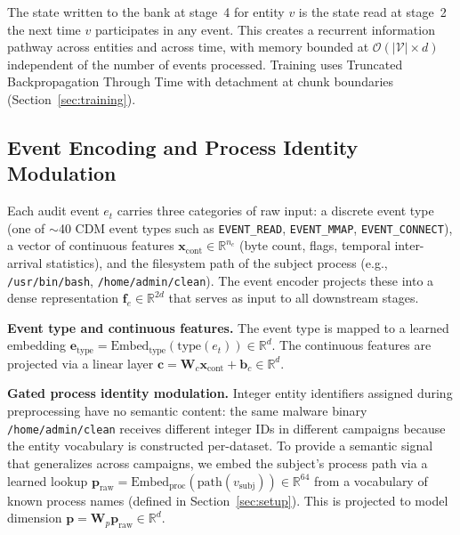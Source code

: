\documentclass[letterpaper,twocolumn,10pt]{article}
\begin{document}
The state written to the bank at stage~4 for entity $v$ is the state read at stage~2 the next time $v$ participates in any event. This creates a recurrent information pathway across entities and across time, with memory bounded at $\mathcal{O}(|\mathcal{V}| \times d)$ independent of the number of events processed. Training uses Truncated Backpropagation Through Time with detachment at chunk boundaries (Section~\ref{sec:training}).

\subsection{Event Encoding and Process Identity Modulation}
\label{sec:event_encoding}

Each audit event $e_t$ carries three categories of raw input: a discrete event type (one of $\sim$40 CDM event types such as \texttt{EVENT\_READ}, \texttt{EVENT\_MMAP}, \texttt{EVENT\_CONNECT}), a vector of continuous features $\mathbf{x}_{\text{cont}} \in \mathbb{R}^{n_c}$ (byte count, flags, temporal inter-arrival statistics), and the filesystem path of the subject process (e.g., \texttt{/usr/bin/bash}, \texttt{/home/admin/clean}). The event encoder projects these into a dense representation $\mathbf{f}_e \in \mathbb{R}^{2d}$ that serves as input to all downstream stages.

\textbf{Event type and continuous features.} The event type is mapped to a learned embedding $\mathbf{e}_{\text{type}} = \text{Embed}_{\text{type}}(\text{type}(e_t)) \in \mathbb{R}^d$. The continuous features are projected via a linear layer $\mathbf{c} = \mathbf{W}_c \mathbf{x}_{\text{cont}} + \mathbf{b}_c \in \mathbb{R}^d$.

\textbf{Gated process identity modulation.} Integer entity identifiers assigned during preprocessing have no semantic content: the same malware binary \texttt{/home/admin/clean} receives different integer IDs in different campaigns because the entity vocabulary is constructed per-dataset. To provide a semantic signal that generalizes across campaigns, we embed the subject's process path via a learned lookup $\mathbf{p}_{\text{raw}} = \text{Embed}_{\text{proc}}(\text{path}(v_{\text{subj}})) \in \mathbb{R}^{64}$ from a vocabulary of known process names (defined in Section~\ref{sec:setup}). This is projected to model dimension $\mathbf{p} = \mathbf{W}_p \mathbf{p}_{\text{raw}} \in \mathbb{R}^d$.
\end{document}
